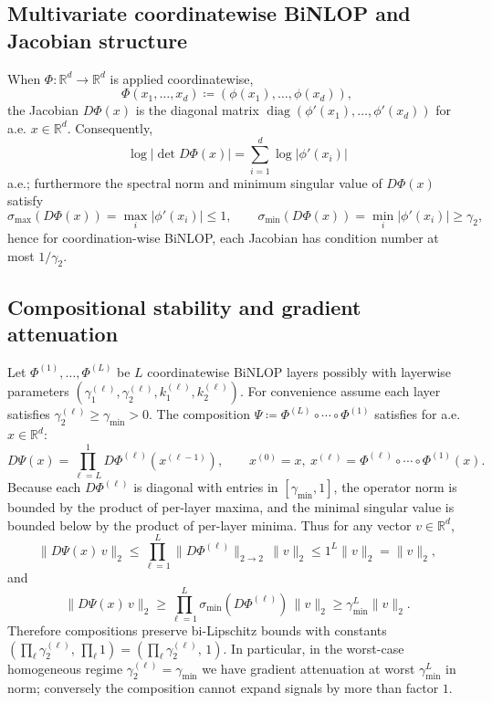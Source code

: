 \documentclass[11pt, twoside, openright, english]{article}
\newcommand{\R}{\mathbb{R}}
\numberwithin{equation}{section}
\theoremstyle{plain}
\theoremstyle{definition}
\theoremstyle{remark}
\begin{document}
\subsection{Multivariate coordinatewise BiNLOP and Jacobian structure}
\label{subsec:multivariate}
When $\Phi:\R^d\to\R^d$ is applied coordinatewise,
\[
\Phi(x_1,\dots,x_d) \coloneqq (\phi(x_1),\dots,\phi(x_d)),
\]
the Jacobian $D\Phi(x)$ is the diagonal matrix $\operatorname{diag}(\phi'(x_1),\dots,\phi'(x_d))$ for a.e. $x\in\R^d$. Consequently,
\[
\log\big|\det D\Phi(x)\big| = \sum_{i=1}^d \log|\phi'(x_i)|
\]
a.e.; furthermore the spectral norm and minimum singular value of $D\Phi(x)$ satisfy
\[
\sigma_{\max}(D\Phi(x)) = \max_{i} |\phi'(x_i)| \le 1,\qquad
\sigma_{\min}(D\Phi(x)) = \min_{i} |\phi'(x_i)| \ge \gamma_2,
\]
hence for coordination-wise BiNLOP, each Jacobian has condition number at most $1/\gamma_2$.

\subsection{Compositional stability and gradient attenuation}
\label{subsec:composition}
Let $\Phi^{(1)},\dots,\Phi^{(L)}$ be $L$ coordinatewise BiNLOP layers possibly with layerwise parameters $(\gamma_1^{(\ell)},\gamma_2^{(\ell)},k_1^{(\ell)},k_2^{(\ell)})$. For convenience assume each layer satisfies $\gamma_2^{(\ell)}\ge \gamma_{\min}>0$. The composition $\Psi \coloneqq \Phi^{(L)}\circ\cdots\circ\Phi^{(1)}$ satisfies for a.e. $x\in\R^d$:
\[
D\Psi(x) = \prod_{\ell=L}^{1} D\Phi^{(\ell)}(x^{(\ell-1)}),\qquad x^{(0)}=x,\ x^{(\ell)}=\Phi^{(\ell)}\circ\cdots\circ\Phi^{(1)}(x).
\]
Because each $D\Phi^{(\ell)}$ is diagonal with entries in $[\gamma_{\min},1]$, the operator norm is bounded by the product of per-layer maxima, and the minimal singular value is bounded below by the product of per-layer minima. Thus for any vector $v\in\R^d$,
\[
\|D\Psi(x)\,v\|_2 \le \prod_{\ell=1}^L \|D\Phi^{(\ell)}\|_{2\to2}\,\|v\|_2 \le 1^L \|v\|_2 = \|v\|_2,
\]
and
\[
\|D\Psi(x)\,v\|_2 \ge \prod_{\ell=1}^L \sigma_{\min}(D\Phi^{(\ell)})\,\|v\|_2 \ge \gamma_{\min}^L \|v\|_2.
\]
Therefore compositions preserve bi-Lipschitz bounds with constants $(\prod_{\ell}\gamma_2^{(\ell)},\,\prod_{\ell}1) = (\prod_{\ell}\gamma_2^{(\ell)},\,1)$. In particular, in the worst-case homogeneous regime $\gamma_2^{(\ell)}=\gamma_{\min}$ we have gradient attenuation at worst $\gamma_{\min}^L$ in norm; conversely the composition cannot expand signals by more than factor $1$.
\end{document}
